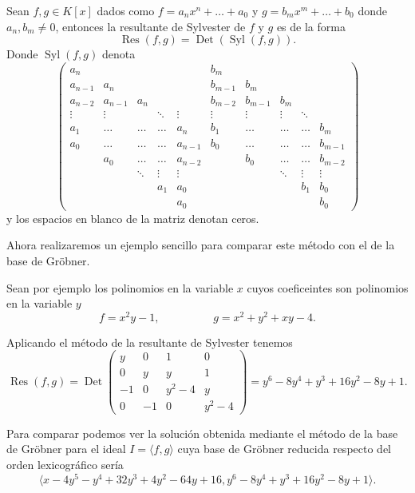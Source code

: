 \begin{definition}
	Sean $f, g \in K[x]$ dados como $f = a_n x^n + \dots + a_0$ y $g = b_m x^m + \dots + b_0$ donde $a_n, b_m \neq 0$, entonces la resultante de Sylvester de $f$ y $g$ es de la forma
$$\operatorname{Res}(f,g) = \operatorname{Det}(\operatorname{Syl}(f,g)).$$
Donde $\operatorname{Syl}(f,g)$ denota
	$$\begin{pmatrix}
	a_n & & & & & b_m & & & & \\
	a_{n-1} & a_n & & & & b_{m-1} & b_m & & & \\
	a_{n-2} & a_{n-1} & a_n & & & b_{m-2} & b_{m-1} & b_m & & \\
	\vdots & \vdots & & \ddots & \vdots & \vdots & \vdots & \vdots & \ddots & \\
	a_1 & \dotso & \dotso & \dotso & a_{n} & b_1 & \dotso & \dotso & \dotso & b_{m} \\
	a_0 & \dotso & \dotso & \dotso & a_{n-1} & b_0 & \dotso & \dotso & \dotso & b_{m-1} \\
	 & a_0 & \dotso & \dotso & a_{n-2} & & b_0 & \dotso & \dotso & b_{m-2} \\
	 & & \ddots & \vdots & \vdots & & & \ddots & \vdots & \vdots \\
	 & & & a_1 & a_0 & & & & b_1 & b_0 \\
	 & & & & a_0 & & & & & b_0
	\end{pmatrix}$$
y los espacios en blanco de la matriz denotan ceros.
\end{definition}

Ahora realizaremos un ejemplo sencillo para comparar este método con el de la base de Gröbner.

Sean por ejemplo los polinomios en la variable $x$ cuyos coeficeintes son polinomios en la variable $y$
$$f = x^2 y - 1, \hspace{2cm} g = x^2 + y^2 + xy - 4.$$

Aplicando el método de la resultante de Sylvester tenemos
$$\operatorname{Res}(f,g) = \operatorname{Det} \begin{pmatrix}
y & 0 & 1 & 0 \\
0 & y & y & 1 \\
-1 & 0 & y^2 - 4 & y \\
0 & -1 & 0 & y^2 - 4
\end{pmatrix} = y^6 - 8y^4 + y^3 + 16y^2 - 8y + 1.$$

Para comparar podemos ver la solución obtenida mediante el método de la base de Gröbner para el ideal $I = \langle f,g \rangle$ cuya base de Gröbner reducida respecto del orden lexicográfico sería
$$\langle x - 4y^5- y^4 + 32y^3 + 4y^2 - 64y + 16 , y^6 - 8y^4 + y^3 + 16y^2 - 8y + 1 \rangle.$$

